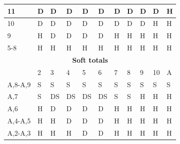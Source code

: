 \documentclass[conference]{IEEEtran}
\begin{document}
\begin{table}[ht]
\begin{tabular}{|l|l|l|l|l|l|l|l|l|l|l|}
11                           & \cellcolor{blue!25}D & \cellcolor{blue!25}D & \cellcolor{blue!25}D & \cellcolor{blue!25}D & \cellcolor{blue!25}D & \cellcolor{blue!25}D & \cellcolor{blue!25}D & \cellcolor{blue!25}D & \cellcolor{blue!25}D & \cellcolor{green!50}H  \\ \hline
10                           & \cellcolor{blue!25}D & \cellcolor{blue!25}D & \cellcolor{blue!25}D & \cellcolor{blue!25}D & \cellcolor{blue!25}D & \cellcolor{blue!25}D & \cellcolor{blue!25}D & \cellcolor{blue!25}D & \cellcolor{green!50}H & \cellcolor{green!50}H \\ \hline
9                            & \cellcolor{green!50}H & \cellcolor{blue!25}D & \cellcolor{blue!25}D & \cellcolor{blue!25}D & \cellcolor{blue!25}D & \cellcolor{green!50}H & \cellcolor{green!50}H & \cellcolor{green!50}H & \cellcolor{green!50}H & \cellcolor{green!50}H  \\ \hline
5-8                          & \cellcolor{green!50}H & \cellcolor{green!50}H & \cellcolor{green!50}H & \cellcolor{green!50}H & \cellcolor{green!50}H & \cellcolor{green!50}H & \cellcolor{green!50}H & \cellcolor{green!50}H & \cellcolor{green!50}H & \cellcolor{green!50}H \\ \hline \hline

\multicolumn{11}{|c|}{\textbf{Soft totals}}                           \\ \hline
                             & 2 & 3 & 4 & 5 & 6 & 7 & 8 & 9 & 10 & A \\ \hline
A,8-A,9                      & \cellcolor{red!75}S & \cellcolor{red!75}S & \cellcolor{red!75}S & \cellcolor{red!75}S & \cellcolor{red!75}S & \cellcolor{red!75}S & \cellcolor{red!75}S & \cellcolor{red!75}S & \cellcolor{red!75}S & \cellcolor{red!75}S  \\ \hline
A,7                          & \cellcolor{red!75}S & \cellcolor{blue!25}DS & \cellcolor{blue!25}DS & \cellcolor{blue!25}DS & \cellcolor{blue!25}DS & \cellcolor{red!75}S & \cellcolor{red!75}S & \cellcolor{green!50}H & \cellcolor{green!50}H & \cellcolor{green!50}H  \\ \hline
A,6                          & \cellcolor{green!50}H & \cellcolor{blue!25}D & \cellcolor{blue!25}D & \cellcolor{blue!25}D & \cellcolor{blue!25}D & \cellcolor{green!50}H & \cellcolor{green!50}H & \cellcolor{green!50}H & \cellcolor{green!50}H & \cellcolor{green!50}H  \\ \hline
A,4-A,5                      & \cellcolor{green!50}H & \cellcolor{green!50}H & \cellcolor{blue!25}D & \cellcolor{blue!25}D & \cellcolor{blue!25}D & \cellcolor{green!50}H & \cellcolor{green!50}H & \cellcolor{green!50}H & \cellcolor{green!50}H & \cellcolor{green!50}H  \\ \hline
A,2-A,3                      & \cellcolor{green!50}H & \cellcolor{green!50}H & \cellcolor{green!50}H & \cellcolor{blue!25}D & \cellcolor{blue!25}D & \cellcolor{green!50}H & \cellcolor{green!50}H & \cellcolor{green!50}H & \cellcolor{green!50}H & \cellcolor{green!50}H  \\ \hline \hline


\end{tabular}
\end{table}
\end{document}
